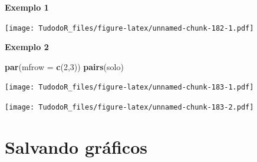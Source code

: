 \documentclass[
]{book}
\newenvironment{Shaded}{\begin{snugshade}}{\end{snugshade}}
\newcommand{\CommentTok}[1]{\textcolor[rgb]{0.56,0.35,0.01}{\textit{#1}}}
\newcommand{\DataTypeTok}[1]{\textcolor[rgb]{0.13,0.29,0.53}{#1}}
\newcommand{\DecValTok}[1]{\textcolor[rgb]{0.00,0.00,0.81}{#1}}
\newcommand{\KeywordTok}[1]{\textcolor[rgb]{0.13,0.29,0.53}{\textbf{#1}}}
\newcommand{\NormalTok}[1]{#1}
\newcommand{\OperatorTok}[1]{\textcolor[rgb]{0.81,0.36,0.00}{\textbf{#1}}}
\begin{document}
\textbf{Exemplo 1}

\begin{Shaded}
\end{Shaded}

\texttt{[image: TudodoR\_files/figure-latex/unnamed-chunk-182-1.pdf]}

\textbf{Exemplo 2}

\begin{Shaded}
\begin{Highlighting}[]
\KeywordTok{par}\NormalTok{(}\DataTypeTok{mfrow =} \KeywordTok{c}\NormalTok{(}\DecValTok{2}\NormalTok{,}\DecValTok{3}\NormalTok{))}
\KeywordTok{pairs}\NormalTok{(solo)}
\end{Highlighting}
\end{Shaded}

\texttt{[image: TudodoR\_files/figure-latex/unnamed-chunk-183-1.pdf]}

\begin{Shaded}
\end{Shaded}

\texttt{[image: TudodoR\_files/figure-latex/unnamed-chunk-183-2.pdf]}

\hypertarget{salvando-gruxe1ficos}{%
\section{Salvando gráficos}\label{salvando-gruxe1ficos}}
\end{document}
